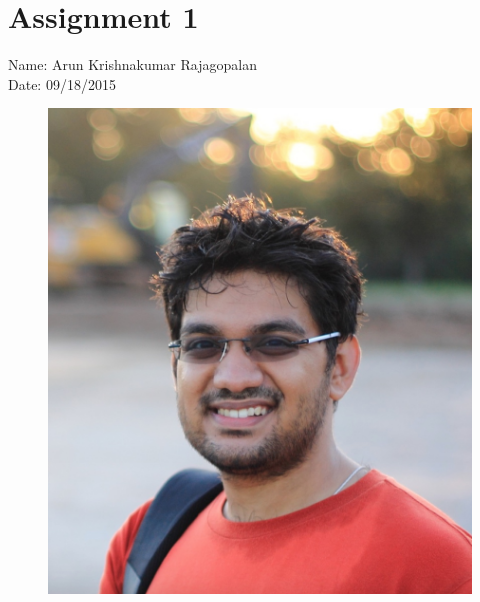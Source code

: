 \documentclass{article}
\begin{document}
\section*{Assignment 1}
Name: Arun Krishnakumar Rajagopalan
\\Date: 09/18/2015

\begin{figure}[t]
    \centering
        \includegraphics[scale=0.35]{bryan_lake}
    \centering
\end{figure}
\end{document}
